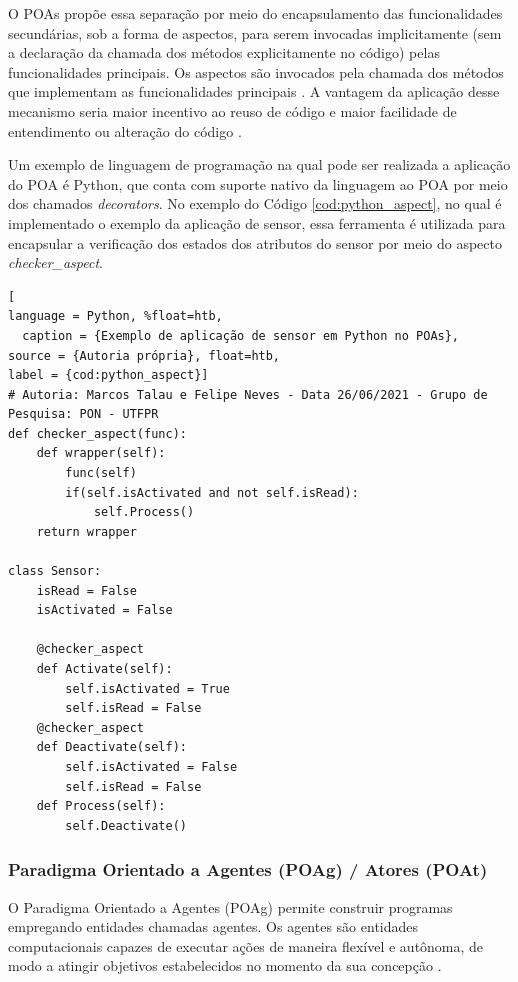 O POAs propõe essa separação por meio do encapsulamento das funcionalidades
secundárias, sob a forma de aspectos, para serem invocadas implicitamente (sem a
declaração da chamada dos métodos explicitamente no código) pelas
funcionalidades principais. Os aspectos são invocados pela chamada dos métodos
que implementam as funcionalidades principais \cite{miles_2004}. A vantagem da
aplicação desse mecanismo seria maior incentivo ao reuso de código e maior
facilidade de entendimento ou alteração do código
\cite{miles_2004}.

Um exemplo de linguagem de programação na qual pode ser realizada a aplicação do
POA é Python, que conta com suporte nativo da linguagem ao POA por meio dos
chamados \textit{decorators}. No exemplo do Código \ref{cod:python_aspect}, no
qual é implementado o exemplo da aplicação de sensor, essa ferramenta é
utilizada para encapsular a verificação dos estados dos atributos do sensor por
meio do aspecto \textit{checker\_aspect}.

\begin{lstlisting}[
language = Python, %float=htb,
  caption = {Exemplo de aplicação de sensor em Python no POAs},
source = {Autoria própria}, float=htb,
label = {cod:python_aspect}]
# Autoria: Marcos Talau e Felipe Neves - Data 26/06/2021 - Grupo de Pesquisa: PON - UTFPR 
def checker_aspect(func):
    def wrapper(self):
        func(self)
        if(self.isActivated and not self.isRead):
            self.Process()
    return wrapper

class Sensor:
    isRead = False
    isActivated = False

    @checker_aspect
    def Activate(self):
        self.isActivated = True
        self.isRead = False
    @checker_aspect
    def Deactivate(self):
        self.isActivated = False
        self.isRead = False
    def Process(self):
        self.Deactivate()
\end{lstlisting}


\subsubsection{Paradigma Orientado a Agentes (POAg) / Atores (POAt)}

O Paradigma Orientado a Agentes (POAg) permite construir programas empregando
entidades chamadas agentes. Os agentes são entidades computacionais capazes de
executar ações de maneira flexível e autônoma, de modo a atingir objetivos
estabelecidos no momento da sua concepção \cite{jennings_1999}.

